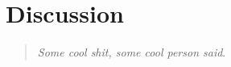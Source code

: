 \chapter{Discussion}

	\begin{quote}
		\textit{Some cool shit, some cool person said}\cite[p.~442~Box~13.3]{interactionDesign}.\\
	\end{quote}
	